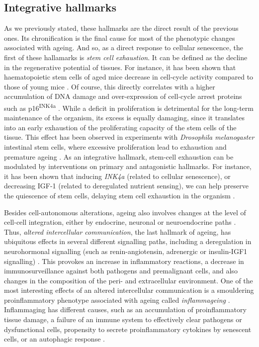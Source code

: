 \subsection{Integrative hallmarks} \label{ss_intro_hallmarks_integrative} %

As we previously stated, these hallmarks are the direct result of the previous ones.
Its chronification is the final cause for most of the phenotypic changes associated with ageing.
And so, as a direct response to cellular senescence, the first of these hallamarks is \emph{stem cell exhaustion}.
It can be defined as the decline in the regenerative potential of tissues.
For instance, it has been shown that haematopoietic stem cells of aged mice decrease in cell-cycle activity compared to those of young mice \cite{DeHaan2018,Shaw2010}.
Of course, this directly correlates with a higher accumulation of DNA damage and over-expression of cell-cycle arrest proteins such as p16\textsuperscript{INK4a} \cite{Janzen2006,Rossi2007,Stenvinkel2017}.
While a deficit in proliferation is detrimental for the long-term maintenance of the organism, its excess is equally damaging, since it translates into an early exhaustion of the proliferating capacity of the stem cells of the tissue.
This effect has been observed in experiments with \textit{Drosophila melanogaster} intestinal stem cells, where excessive proliferation lead to exhaustion and premature ageing \cite{Rera2011,Wang2014}.
As an integrative hallmark, stem-cell exhaustion can be modulated by interventions on primary and antagonistic hallmarks.
For instance, it has been shown that inducing \textit{INK4a} (related to cellular senescence), or decreasing IGF-1 (related to deregulated nutrient sensing), we can help preserve the quiescence of stem cells, delaying stem cell exhaustion in the organism \cite{Chakkalakal2012,Tumpel2019}.

Besides cell-autonomous alterations, ageing also involves changes at the level of cell-cell integration, either by endocrine, neuronal or neuroendocrine paths \cite{Laplante2012,Rando2012,Zhang2013}.
Thus, \emph{altered intercellular communication}, the last hallmark of ageing, has ubiquitous effects in several different signalling paths, including a deregulation in neurohormonal signalling (such as renin-angiotensin, adrenergic or insulin-IGF1 signalling) \cite{Bocheva2019}.
This provokes an increase in inflammatory reactions, a decrease in immunosurveillance against both pathogens and premalignant cells, and also changes in the composition of the peri- and extracellular environment.
One of the most interesting effects of an altered intercellular communication is a smouldering proinflammatory phenotype associated with ageing called \emph{inflammageing} \cite{Franceschi2014}.
Inflammaging has different causes, such as an accumulation of proinflammatory tissue damage, a failure of an immune system to effectively clear pathogens or dysfunctional cells, propensity to secrete proinflammatory cytokines by senescent cells, or an autophagic response \cite{Franceschi2017,Salminen2012}.

